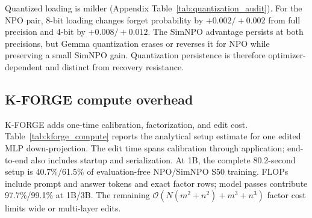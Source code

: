 \documentclass[11pt]{article}
\begin{document}
\long{}

Quantized loading is milder (Appendix Table~\ref{tab:quantization_audit}). For the NPO pair, 8-bit loading changes forget probability by $+0.002/\!+\!0.002$ from full precision and 4-bit by $+0.008/\!+\!0.012$. The SimNPO advantage persists at both precisions, but Gemma quantization erases or reverses it for NPO while preserving a small SimNPO gain. Quantization persistence is therefore optimizer-dependent and distinct from recovery resistance.

\subsection{K-FORGE compute overhead}
\label{sec:compute_overhead}
K-FORGE adds one-time calibration, factorization, and edit cost. Table~\ref{tab:kforge_compute} reports the analytical setup estimate for one edited MLP down-projection. The edit time spans calibration through application; end-to-end also includes startup and serialization. At 1B, the complete 80.2-second setup is 40.7\%/61.5\% of evaluation-free NPO/SimNPO S50 training. FLOPs include prompt and answer tokens and exact factor rows; model passes contribute 97.7\%/99.1\% at 1B/3B. The remaining $\mathcal{O}(N(m^2+n^2)+m^3+n^3)$ factor cost limits wide or multi-layer edits.
\end{document}
